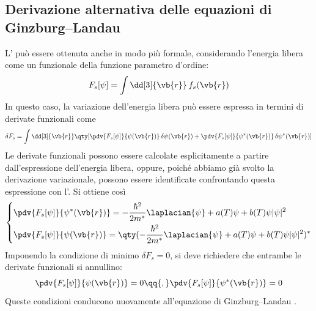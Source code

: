 \subsection{Derivazione alternativa delle equazioni di Ginzburg--Landau}
L' può essere ottenuta anche in modo più formale, considerando l'energia libera come un funzionale della funzione parametro d'ordine:
\begin{equation*}
   F_s[\psi]
   = \int \dd[3]{\vb{r}} \, f_s(\vb{r})
\end{equation*}
In questo caso, la variazione dell'energia libera può essere espressa in termini di derivate funzionali come
\begin{equation*}
   \delta F_s
   = \int \dd[3]{\vb{r}} \qty[
   \pdv{F_s[\psi]}{\psi(\vb{r})}\,\delta \psi(\vb{r})
   + \pdv{F_s[\psi]}{\psi^*(\vb{r})}\,\delta \psi^*(\vb{r})
   ]
\end{equation*}
Le derivate funzionali possono essere calcolate esplicitamente a partire dall'espressione dell'energia libera, oppure, poiché abbiamo già svolto la derivazione variazionale, possono essere identificate confrontando questa espressione con l'. Si ottiene così
\begin{equation*}
   \begin{dcases}
      \pdv{F_s[\psi]}{\psi^*(\vb{r})}
      = -\frac{\hbar^2}{2m^*}\laplacian{\psi}
      + a(T)\psi + b(T)\psi |\psi|^2
      \\
      \pdv{F_s[\psi]}{\psi(\vb{r})}
      = \qty(
      -\frac{\hbar^2}{2m^*}\laplacian{\psi}
      + a(T)\psi + b(T)\psi |\psi|^2
      )^*
   \end{dcases}
\end{equation*}
Imponendo la condizione di minimo $\delta F_s = 0$, si deve richiedere che entrambe le derivate funzionali si annullino:
\begin{equation*}
   \pdv{F_s[\psi]}{\psi(\vb{r})} = 0
   \qq{,}
   \pdv{F_s[\psi]}{\psi^*(\vb{r})} = 0
\end{equation*}
Queste condizioni conducono nuovamente all'equazione di Ginzburg--Landau .
